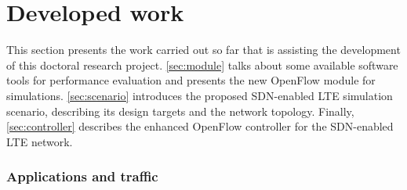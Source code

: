\clearpage
\section{Developed work}
\label{ch:developed}

This section presents the work carried out so far that is assisting the
development of this doctoral research project. \autoref{sec:module} talks about
some available software tools for performance evaluation and presents the new
OpenFlow module for simulations. \autoref{sec:scenario} introduces the proposed
\ac{SDN}-enabled \ac{LTE} simulation scenario, describing its design targets
and the network topology. Finally, \autoref{sec:controller} describes the
enhanced OpenFlow controller for the \ac{SDN}-enabled \ac{LTE} network.

\subsubsection{Applications and traffic}
\label{subsec:applications}

